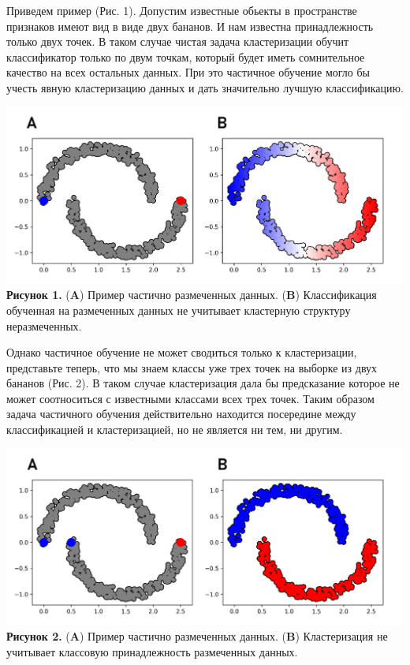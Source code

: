 Приведем пример (Рис. 1). Допустим известные обьекты в пространстве признаков имеют вид в виде двух бананов. И нам известна принадлежность только двух точек. В таком случае чистая задача кластеризации обучит классификатор только по двум точкам, который будет иметь сомнительное качество на всех остальных данных. При это частичное обучение могло бы учесть явную кластеризацию данных и дать значительно лучшую классификацию.\\

\begin{center}
    \includegraphics[width=1.0\textwidth]{chapters/clustering/images/picture_1.png}
    \textbf{Рисунок 1.} (\textbf{A}) Пример частично размеченных данных. (\textbf{B}) Классификация обученная на размеченных данных не учитывает кластерную структуру неразмеченных. 
\end{center}

Однако частичное обучение не может сводиться только к кластеризации, представьте теперь, что мы знаем классы уже трех точек на выборке из двух бананов (Рис. 2). В таком случае кластеризация дала бы предсказание которое не может соотноситься с известными классами всех трех точек. Таким образом задача частичного обучения действительно находится посередине между классификацией и кластеризацией, но не является ни тем, ни другим. \\
\begin{center}
    \includegraphics[width=1.0\textwidth]{chapters/clustering/images/picture_2.png}
    \textbf{Рисунок 2.} (\textbf{A}) Пример частично размеченных данных. (\textbf{B}) Кластеризация не учитывает классовую принадлежность размеченных данных. 
\end{center}

